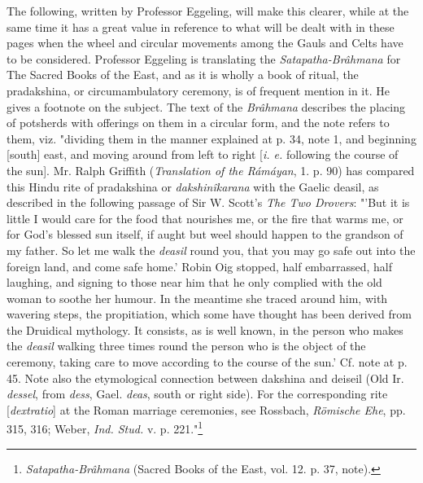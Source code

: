 \documentclass[a4paper, 11pt, oneside, polutonikogreek, english]{article}
\begin{document}
The following, written by Professor Eggeling, will make this clearer, while at the same time it has a great value in reference to what will be dealt with in these pages when the wheel and circular movements among the Gauls and Celts have to be considered. Professor Eggeling is translating the \emph{Satapatha-Brâhmana} for The Sacred Books of the East, and as it is wholly a book of ritual, the pradakshina, or circumambulatory ceremony, is of frequent mention in it. He gives a footnote on the subject. The text of the \emph{Brâhmana} describes the placing of potsherds with offerings on them in a circular form, and the note refers to them, viz. "dividing them in the manner explained at p. 34, note 1, and beginning [south] east, and moving around from left to right [\emph{i. e.} following the course of the sun]. Mr. Ralph Griffith (\emph{Translation of the Rámáyan}, 1. p. 90) has compared this Hindu rite of pradakshina or \emph{dakshinîkarana} with the Gaelic deasil, as described in the following passage of Sir W. Scott's \emph{The Two Drovers}: "'But it is little I would care for the food that nourishes me, or the fire that warms me, or for God's blessed sun itself, if aught but weel should happen to the grandson of my father. So let me walk the \emph{deasil} round you, that you may go safe out into the foreign land, and come safe home.' Robin Oig stopped, half embarrassed, half laughing, and signing to those near him that he only complied with the old woman to soothe her humour. In the meantime she traced around him, with wavering steps, the propitiation, which some have thought has been derived from the Druidical mythology. It consists, as is well known, in the person who makes the \emph{deasil} walking three times round the person who is the object of the ceremony, taking care to move according to the course of the sun.' Cf. note at p. 45. Note also the etymological connection between dakshina and deiseil (Old Ir. \emph{dessel}, from \emph{dess}, Gael. \emph{deas}, south or right side). For the corresponding rite [\emph{dextratio}] at the Roman marriage ceremonies, see Rossbach, \emph{Römische Ehe}, pp. 315, 316; Weber, \emph{Ind. Stud.} v. p. 221."\footnote{\emph{Satapatha-Brâhmana} (Sacred Books of the East, vol. 12. p. 37, note).}
\end{document}
